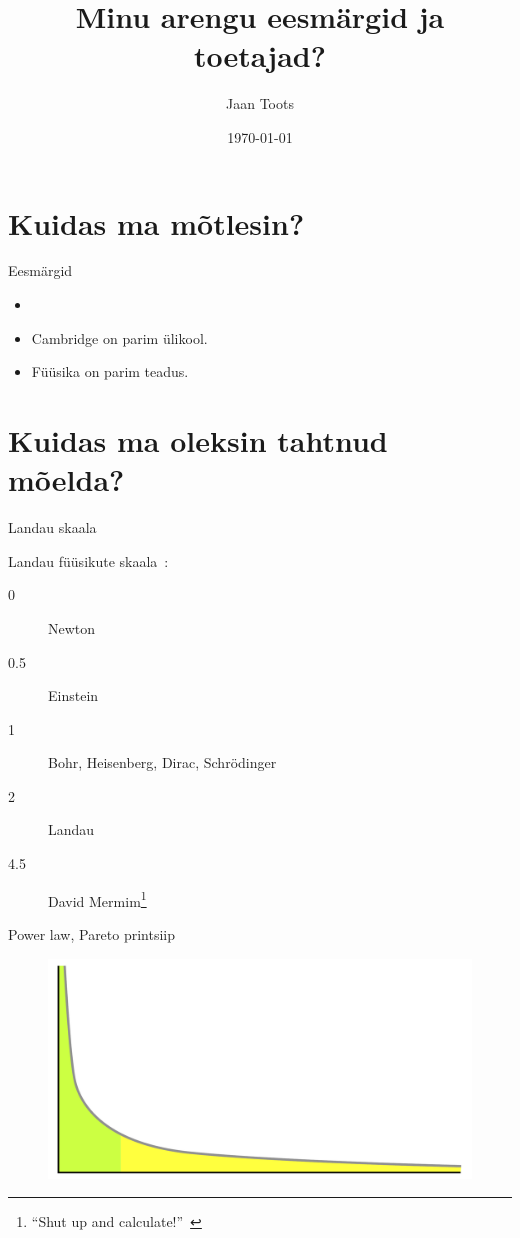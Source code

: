\documentclass{beamer}
\title{Minu arengu eesmärgid ja toetajad?}
\author{Jaan Toots}
\date{\today}
\begin{document}
\maketitle

\section{Kuidas ma mõtlesin?}

\begin{frame}{Eesmärgid}

  \begin{itemize}
  \item
  \item<2-> Cambridge on parim ülikool.
  \item<3-> Füüsika on parim teadus.
  \end{itemize}

\end{frame}

\section{Kuidas ma oleksin tahtnud mõelda?}

\begin{frame}{Landau skaala}

  Landau füüsikute skaala~\cite{hey1997einstein}:
  \begin{description}
  \item[0] Newton
  \item[0.5] Einstein
  \item[1] Bohr, Heisenberg, Dirac, Schrödinger
  \item[2] Landau
  \item[4.5] David Mermim\footnote{``Shut up and
      calculate!''~\cite{mermin2004could}}
  \end{description}

\end{frame}

\begin{frame}{Power law, Pareto printsiip}

  \begin{figure}[h]
    \centering
    \includegraphics[width=\textwidth]{long_tail.pdf}
  \end{figure}

\end{frame}
\end{document}
